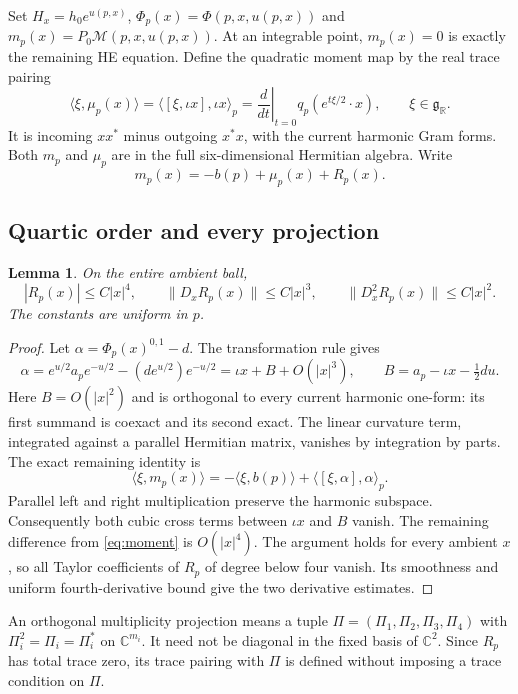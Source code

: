 \documentclass[11pt]{amsart}
\newtheorem{lemma}[theorem]{Lemma}
\theoremstyle{definition}
\theoremstyle{remark}
\newcommand{\CC}{\mathbb C}
\newcommand{\RR}{\mathbb R}
\begin{document}
Set $H_x=h_0e^{u(p,x)}$, $\Phi_p(x)=\Phi(p,x,u(p,x))$ and
$m_p(x)=P_0\mathcal M(p,x,u(p,x))$. At an integrable point,
$m_p(x)=0$ is exactly the remaining HE equation. Define the quadratic
moment map by the real trace pairing
\begin{equation}\label{eq:moment}
 \langle\xi,\mu_p(x)\rangle
 =\langle[\xi,\iota x],\iota x\rangle_p
 =\left.\frac{d}{dt}\right|_{t=0}q_p(e^{t\xi/2}\cdot x),
 \qquad \xi\in\mathfrak g_{\RR}.
\end{equation}
It is incoming $xx^*$ minus outgoing $x^*x$, with the current harmonic
Gram forms. Both $m_p$ and $\mu_p$ are in the full six-dimensional
Hermitian algebra. Write
\begin{equation}\label{eq:residual}
 m_p(x)=-b(p)+\mu_p(x)+R_p(x).
\end{equation}

\subsection{Quartic order and every projection}
\begin{lemma}\label{lem:quartic}
On the entire ambient ball,
\[
 |R_p(x)|\le C|x|^4,\qquad
 \|D_xR_p(x)\|\le C|x|^3,\qquad
 \|D_x^2R_p(x)\|\le C|x|^2.
\]
The constants are uniform in $p$.
\end{lemma}
\begin{proof}
Let $\alpha=\Phi_p(x)^{0,1}-d$. The transformation rule gives
\[
 \alpha=e^{u/2}a_pe^{-u/2}-(de^{u/2})e^{-u/2}
       =\iota x+B+O(|x|^3),\qquad
 B=a_p-\iota x-\tfrac12du.
\]
Here $B=O(|x|^2)$ and is orthogonal to every current harmonic
one-form: its first summand is coexact and its second exact.
The linear curvature term, integrated against a parallel Hermitian
matrix, vanishes by integration by parts. The exact remaining identity is
\begin{equation}\label{eq:integrated-moment}
 \langle\xi,m_p(x)\rangle
 =-\langle\xi,b(p)\rangle+\langle[\xi,\alpha],\alpha\rangle_p.
\end{equation}
Parallel left and right multiplication preserve the harmonic subspace.
Consequently both cubic cross terms between $\iota x$ and $B$ vanish.
The remaining difference from \eqref{eq:moment} is $O(|x|^4)$.
The argument holds for every ambient $x$, so all Taylor coefficients
of $R_p$ of degree below four vanish. Its smoothness and uniform
fourth-derivative bound give the two derivative estimates.
\end{proof}

An orthogonal multiplicity projection means a tuple
$\Pi=(\Pi_1,\Pi_2,\Pi_3,\Pi_4)$ with
$\Pi_i^2=\Pi_i=\Pi_i^*$ on $\CC^{m_i}$. It need not be diagonal
in the fixed basis of $\CC^2$. Since $R_p$ has total trace zero,
its trace pairing with $\Pi$ is defined without imposing a trace
condition on $\Pi$.
\end{document}
